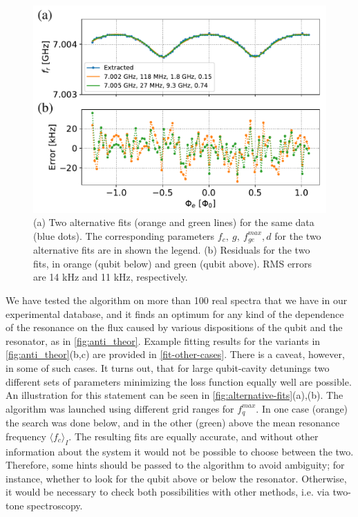\documentclass[%
 aip,
 amsmath,amssymb,
 reprint,%
]{revtex4-1}
\begin{document}
\begin{figure}
	\centering
	\includegraphics[width=\linewidth]{alternative_fits}
	\caption{(a) Two alternative fits (orange and green lines) for the same data (blue dots). The corresponding parameters $f_c,\ g,\ f_{ge}^{max}, d$ for the two alternative fits are in shown the legend. (b) Residuals for the two fits, in orange (qubit below) and green (qubit above). RMS errors are 14 kHz and 11 kHz, respectively.}
	\label{fig:alternative-fits}
\end{figure}

We have tested the algorithm on more than 100 real spectra that we have in our experimental database, and it finds an optimum for any kind of the dependence of the resonance on the flux caused by various dispositions of the qubit and the resonator, as in \autoref{fig:anti_theor}. Example fitting results for the variants in \autoref{fig:anti_theor}(b,c) are provided in \autoref{fit-other-cases}. There is a caveat, however, in some of such cases. It turns out, that for large qubit-cavity detunings two different sets of parameters minimizing the loss function equally well are possible. An illustration for this statement can be seen in \autoref{fig:alternative-fits}(a),(b). The algorithm was launched using different grid ranges for $f_q^{max}$. In one case (orange) the search was done below, and in the other (green) above the mean resonance frequency $\langle f_c\rangle_{I}$. The resulting fits are equally accurate, and without other information about the system it would not be possible to choose between the two. Therefore, some hints should be passed to the algorithm to avoid ambiguity; for instance, whether to look for the qubit above or below the resonator. Otherwise, it would be necessary to check both possibilities with other methods, i.e. via two-tone spectroscopy.
\end{document}

